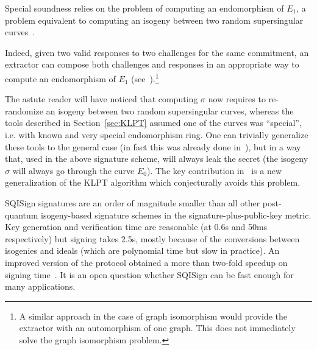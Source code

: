 Special soundness relies on the problem of computing an endomorphism of $E_1$, a problem equivalent to computing an isogeny between two random supersingular  curves~\cite{GPS20,Reductions18,Wes22}.


%
Indeed, given two valid responses to two challenges for the same commitment, an extractor can compose both challenges and responses in an appropriate way to compute an endomorphism of $E_1$ (see~\cite{DFKLPW20}).\footnote{A similar approach in the case of graph isomorphism would provide the extractor with an automorphism of one graph. This does not immediately solve the graph isomorphism problem.}

The astute reader will have noticed that computing $\sigma$ now requires to re-randomize an isogeny between two random supersingular curves, whereas the tools described in Section~\ref{sec:KLPT} assumed one of the curves was ``special'', i.e. with known and very special endomorphism ring. One can trivially generalize these tools to the general case (in fact this was already done in~\cite{KLPT}), but in a way that, used in the above signature scheme, will always leak the secret (the isogeny $\sigma$ will always go through the curve $E_0$). 
%
The key contribution in~\cite{DFKLPW20} is a new generalization of the KLPT algorithm which conjecturally avoids this problem. 

SQISign signatures are an order of magnitude smaller than all other post-quantum isogeny-based signature schemes in the signature-plus-public-key metric. Key generation and verification time are reasonable (at 0.6s and 50ms respectively) but signing takes 2.5s, mostly because of the conversions between isogenies and ideals (which are polynomial time but slow in practice).
%
An improved version of the protocol obtained a more than two-fold speedup on signing time~\cite{SQIsign2.0}.
%
It is an open question whether SQISign can be fast enough for many applications. 

